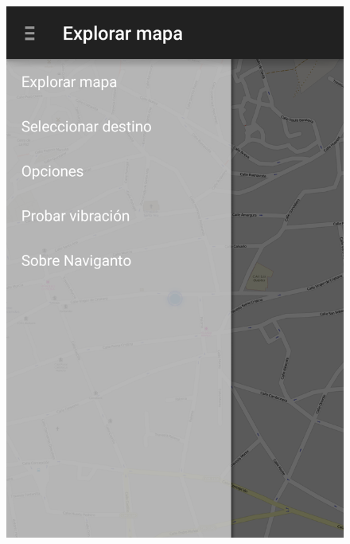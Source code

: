 \begin{slide}
\begin{center}
\begin{minipage}[b]{0.4\linewidth}
\begin{center}
\begin{figure}
          \includegraphics[height=0.65\textheight]{img/naviganto-barralateral.png}
        \end{figure}
      \end{center}
    \end{minipage}
  \end{center}
\end{slide}

